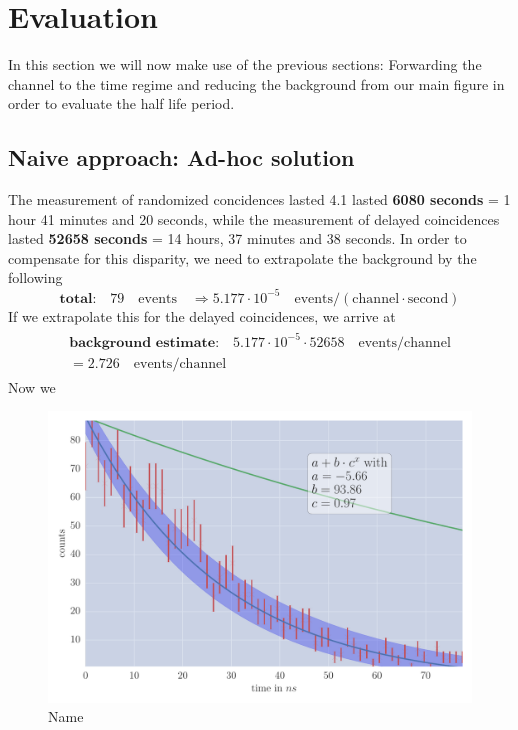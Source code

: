 \section{Evaluation}
In this section we will now make use of the previous sections: Forwarding the channel to the time regime and
reducing the background from our main figure in order to evaluate the half life period.
\subsection{Naive approach: Ad-hoc solution}
The measurement of randomized concidences lasted 4.1 lasted \textbf{6080 seconds} = 1 hour 41 minutes and 20 seconds, while
the measurement of delayed coincidences lasted \textbf{52658 seconds} =  14 hours, 37 minutes and 38 seconds. 
In order to compensate for this disparity, we need to extrapolate the background by the following
\begin{equation}
\mathrm{\textbf{total:} } \quad 79 \quad \mathrm{events} \quad \Rightarrow 5.177\cdot 10^{-5}\quad \mathrm{events/ (channel \cdot second)}
\end{equation}
If we extrapolate this for the delayed coincidences, we arrive at
\begin{align}
\begin{split}
\mathrm{\textbf{background estimate:} } \quad  5.177\cdot 10^{-5} \cdot 52658 \quad \mathrm{events / channel} \\
= 2.726\quad \mathrm{events/ channel}
\end{split}
\end{align}
Now we 

\begin{figure}[htpb]
    \centering
    \includegraphics[width=0.8\linewidth]{analysis/figures/plot4_1_reg}
    \caption{Name}
    \label{fig:name}
\end{figure}




